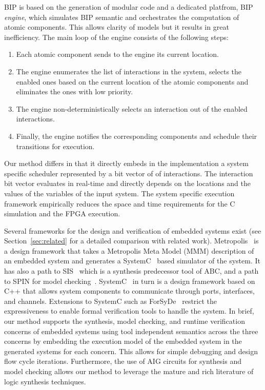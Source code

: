 BIP is based on the generation of modular code and a dedicated platfrom, BIP \emph{engine}, which simulates BIP semantic and orchestrates the computation of atomic components. This allows clarity of models but it results in great inefficiency. The main loop of the engine consists of the following steps:
\begin{enumerate}
\item Each atomic component sends to the engine its current location.
\item The engine enumerates the list of interactions in the system, 
  selects the enabled ones based on the current location of the atomic 
  components and eliminates the ones with low priority.
\item The engine non-deterministically selects an interaction out of the enabled interactions.
\item Finally, the engine notifies the corresponding components and schedule their transitions for execution. 
\end{enumerate}
Our method differs in that it directly embeds in the implementation a system specific scheduler represented by a bit vector of of interactions.
The interaction bit vector evaluates in real-time and directly depends on the locations and the values of the variables of the input system. 
The system specific execution framework empirically reduces the space and time requirements for the C simulation and the FPGA execution. 


Several frameworks for the design and verification of embedded systems exist 
(see Section~\ref{sec:related} for a detailed comparison with related work).
%
Metropolis~\cite{metropolis1,metropolis2} is a design framework that
takes a Metropolis Meta Model (MMM) description of an embedded system 
and generates a SystemC~\cite{systemc} based simulator of the system.
It has also a path to SIS~\cite{brayton92sis} which is a synthesis predecessor tool 
of ABC, and a path to SPIN for model checking~\cite{HolzSpin97}. 
SystemC~\cite{systemc} in turn is a design framework based on C++ that allows
system components to communicate through ports, interfaces, and channels.
Extensions to SystemC such as ForSyDe~\cite{SanderJ04} restrict the 
expressiveness to enable formal verification tools to handle the system. 
In brief, our method supports the synthesis, model checking, and runtime verification 
concerns of embedded systems using tool independent semantics across the three concerns
by embedding the execution model of the embedded system in the generated systems 
for each concern. 
This allows for simple debugging and design flow cycle iterations. Furthermore, 
the use of AIG circuits for synthesis and model checking allows our method to leverage
the mature and rich literature of logic synthesis techniques. 

